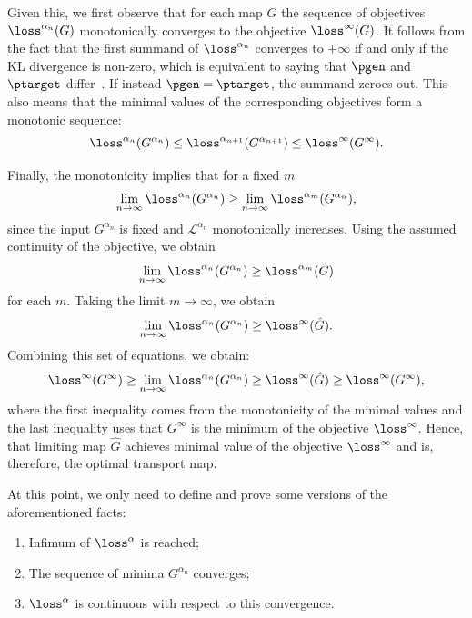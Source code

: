 Given this, we first observe that for each map $G$ the sequence of objectives $\loss^{\alpha_n}(G)$ monotonically converges to the objective $\loss^\infty(G)$. It follows from the fact that the first summand of $\loss^{\alpha_n}$ converges to $+\infty$ if and only if the KL divergence is non-zero, which is equivalent to saying that $\pgen$ and $\ptarget$ differ~\cite{wang2024prolificdreamer}. If instead $\pgen = \ptarget$, the summand zeroes out. This also means that the minimal values of the corresponding objectives form a monotonic sequence:
\begin{equation}
    \loss^{\alpha_n}(G^{\alpha_n}) \leq \loss^{\alpha_{n + 1}}(G^{\alpha_{n + 1}}) \leq \loss^{\infty}(G^\infty).
\end{equation}

Finally, the monotonicity implies that for a fixed $m$
\begin{equation}
    \lim\limits_{n \rightarrow \infty} \loss^{\alpha_n}(G^{\alpha_n}) \geq \lim\limits_{n \rightarrow \infty} \loss^{\alpha_m}(G^{\alpha_n}),
\end{equation}
since the input $G^{\alpha_n}$ is fixed and $\mathcal{L}^{\alpha_n}$ monotonically increases. Using the assumed continuity of the objective, we obtain
\begin{equation}
    \lim\limits_{n \rightarrow \infty} \loss^{\alpha_n}(G^{\alpha_n}) \geq \loss^{\alpha_m}(\hat{G})
\end{equation}
for each $m$. Taking the limit $m \rightarrow \infty$, we obtain
\begin{equation}
    \lim\limits_{n \rightarrow \infty} \loss^{\alpha_n}(G^{\alpha_n}) \geq \loss^\infty(\hat{G}).
\end{equation}
Combining this set of equations, we obtain:
\begin{equation}
    \loss^\infty(G^\infty) \geq \lim\limits_{n \rightarrow \infty} \loss^{\alpha_n}(G^{\alpha_n}) \geq \loss^\infty(\hat{G}) \geq \loss^\infty(G^\infty),
\end{equation}
where the first inequality comes from the monotonicity of the minimal values and the last inequality uses that $G^\infty$ is the minimum of the objective $\loss^\infty$. Hence, that limiting map $\hat{G}$ achieves minimal value of the objective $\loss^\infty$ and is, therefore, the optimal transport map.

At this point, we only need to define and prove some versions of the aforementioned facts:
\begin{enumerate}
    \item Infimum of $\loss^{\alpha}$ is reached;
    \item The sequence of minima $G^{\alpha_n}$ converges;
    \item $\loss^{\alpha}$ is continuous with respect to this convergence.
\end{enumerate}

